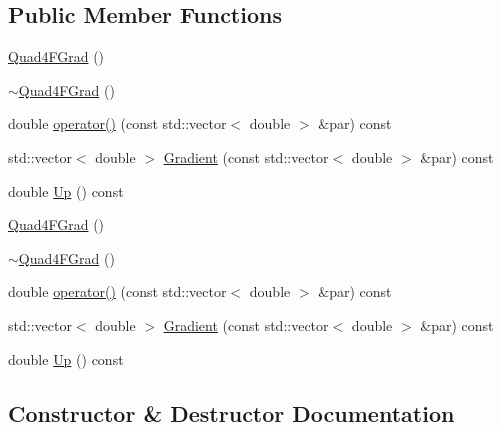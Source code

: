 \subsection*{Public Member Functions}
\begin{DoxyCompactItemize}
\item 
\mbox{\hyperlink{classROOT_1_1Minuit2_1_1Quad4FGrad_a2776a889d4aa5c04bff2433bac520557}{Quad4\+F\+Grad}} ()
\item 
\mbox{\hyperlink{classROOT_1_1Minuit2_1_1Quad4FGrad_a9b87859d52b24a21c72491faba7fb6a5}{$\sim$\+Quad4\+F\+Grad}} ()
\item 
double \mbox{\hyperlink{classROOT_1_1Minuit2_1_1Quad4FGrad_a8aaafaa9d7f974e27f5b54b30289dd6d}{operator()}} (const std\+::vector$<$ double $>$ \&par) const
\item 
std\+::vector$<$ double $>$ \mbox{\hyperlink{classROOT_1_1Minuit2_1_1Quad4FGrad_afd3b64a4236e31bdf9c330e33ac7ac89}{Gradient}} (const std\+::vector$<$ double $>$ \&par) const
\item 
double \mbox{\hyperlink{classROOT_1_1Minuit2_1_1Quad4FGrad_a0c477f97bac7a89bea6bdea9fdae92cf}{Up}} () const
\item 
\mbox{\hyperlink{classROOT_1_1Minuit2_1_1Quad4FGrad_a2776a889d4aa5c04bff2433bac520557}{Quad4\+F\+Grad}} ()
\item 
\mbox{\hyperlink{classROOT_1_1Minuit2_1_1Quad4FGrad_a9b87859d52b24a21c72491faba7fb6a5}{$\sim$\+Quad4\+F\+Grad}} ()
\item 
double \mbox{\hyperlink{classROOT_1_1Minuit2_1_1Quad4FGrad_a8aaafaa9d7f974e27f5b54b30289dd6d}{operator()}} (const std\+::vector$<$ double $>$ \&par) const
\item 
std\+::vector$<$ double $>$ \mbox{\hyperlink{classROOT_1_1Minuit2_1_1Quad4FGrad_afd3b64a4236e31bdf9c330e33ac7ac89}{Gradient}} (const std\+::vector$<$ double $>$ \&par) const
\item 
double \mbox{\hyperlink{classROOT_1_1Minuit2_1_1Quad4FGrad_a0c477f97bac7a89bea6bdea9fdae92cf}{Up}} () const
\end{DoxyCompactItemize}


\subsection{Constructor \& Destructor Documentation}
\mbox{\label{classROOT_1_1Minuit2_1_1Quad4FGrad_a2776a889d4aa5c04bff2433bac520557}} 
